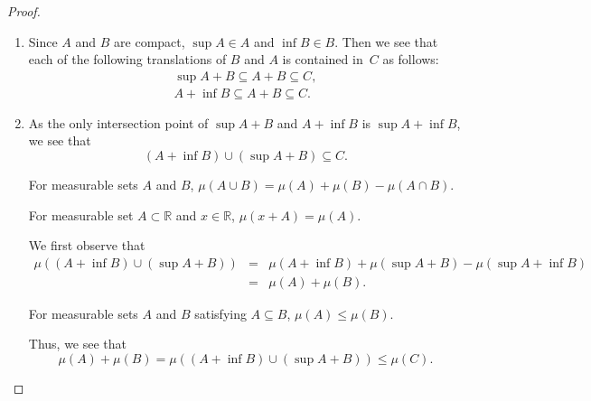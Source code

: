 \begin{proof}
\begin{enumerate}
        \item Since \(A\) and \(B\) are compact, { \(\sup A \in A\) and \(\inf B \in B\). Then} we see that each of the following translations of \(B\) and \(A\) is contained in~\(C\) as follows:
        \begin{eqnarray*}
            \sup A + B
            {
             \subseteq A + B} \subseteq C, \\
            A + \inf B
            {
             \subseteq A + B} \subseteq C.
        \end{eqnarray*}
        \item As the only intersection point of \(\sup A + B\) and \(A + \inf B\) is \(\sup A + \inf B\), we see that
        \begin{equation*}
            (A + \inf B) \cup (\sup A + B) \subseteq C.
        \end{equation*}
        {
        \begin{lemma}
            For measurable sets \(A\) and \(B\),
            \(\mu(A \cup B) = \mu(A) + \mu(B) - \mu(A \cap B)\).
        \end{lemma}
        \begin{lemma}
            For measurable set \(A\subset \mathbb{R}\) and \(x \in \mathbb{R}\), \(\mu(x+A) = \mu(A)\).
        \end{lemma}
        }
        We first observe that
        \begin{eqnarray*}
            \mu\left((A+\inf B) \cup (\sup A + B)\right) & = & \mu(A+\inf B) + \mu(\sup A + B) - \mu(\sup A + \inf B)\\
            & = & \mu(A) + \mu(B).
        \end{eqnarray*}
        {
        \begin{lemma}
            For measurable sets \(A\) and \(B\) satisfying \(A \subseteq B\), \(\mu(A) \leq \mu(B)\).
        \end{lemma}
        }
        Thus, we see that
        \begin{equation*}
            \mu(A) + \mu(B) = \mu\left((A+\inf B) \cup (\sup A + B)\right) \leq \mu(C).
        \end{equation*}
    \end{enumerate}
\end{proof}
